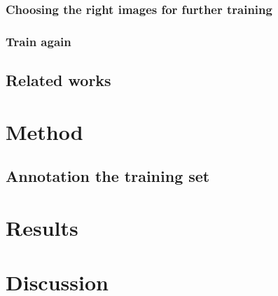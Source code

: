 \documentclass[USenglish]{ifimaster}  %
\begin{document}
\subsection{Choosing the right images for further training}
\subsection{Train again}
\section{Related works}
\newpage
\chapter{Method}
\section{Annotation the training set}


\chapter{Results}                     

\chapter{Discussion}



\backmatter{}
\printbibliography
\end{document}
